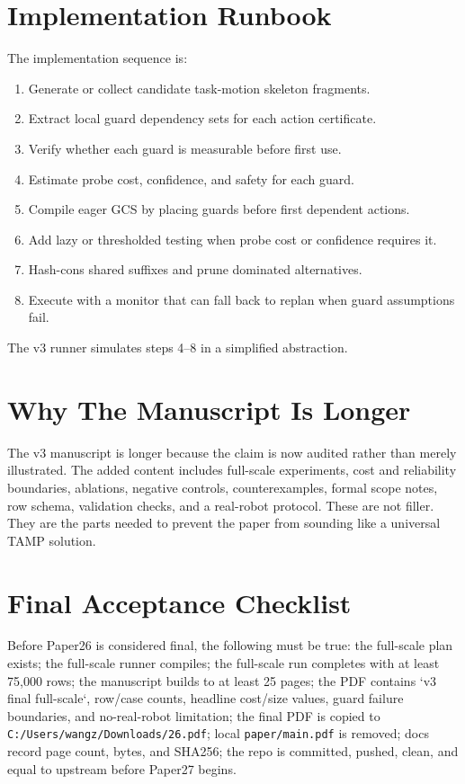 \documentclass{article}
\begin{document}
\section{Implementation Runbook}
The implementation sequence is:
\begin{enumerate}
\item Generate or collect candidate task-motion skeleton fragments.
\item Extract local guard dependency sets for each action certificate.
\item Verify whether each guard is measurable before first use.
\item Estimate probe cost, confidence, and safety for each guard.
\item Compile eager GCS by placing guards before first dependent actions.
\item Add lazy or thresholded testing when probe cost or confidence requires it.
\item Hash-cons shared suffixes and prune dominated alternatives.
\item Execute with a monitor that can fall back to replan when guard assumptions fail.
\end{enumerate}
The v3 runner simulates steps 4--8 in a simplified abstraction.

\section{Why The Manuscript Is Longer}
The v3 manuscript is longer because the claim is now audited rather than merely illustrated. The added content includes full-scale experiments, cost and reliability boundaries, ablations, negative controls, counterexamples, formal scope notes, row schema, validation checks, and a real-robot protocol. These are not filler. They are the parts needed to prevent the paper from sounding like a universal TAMP solution.

\section{Final Acceptance Checklist}
Before Paper26 is considered final, the following must be true: the full-scale plan exists; the full-scale runner compiles; the full-scale run completes with at least 75,000 rows; the manuscript builds to at least 25 pages; the PDF contains `v3 final full-scale`, row/case counts, headline cost/size values, guard failure boundaries, and no-real-robot limitation; the final PDF is copied to \texttt{C:/Users/wangz/Downloads/26.pdf}; local \texttt{paper/main.pdf} is removed; docs record page count, bytes, and SHA256; the repo is committed, pushed, clean, and equal to upstream before Paper27 begins.
\end{document}

